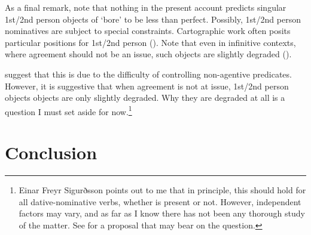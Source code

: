 \documentclass[output=paper,colorlinks,citecolor=brown,
]{langscibook}
\def\exattr#1{\hfill{} #1}
\begin{document}
As a final remark, note that nothing in the present account  predicts  singular 1st/2nd person objects of  `bore' to be less than perfect. Possibly, 1st/2nd person nominatives  are subject to special constraints. Cartographic work often  posits particular positions  for 1st/2nd person (\citealt{Savescu:2009al}). Note that even in infinitive contexts, where agreement should not be an issue, such objects are slightly degraded (\citealt[271]{SigurTHsson:2008dm}).


\z
\citet[271]{SigurTHsson:2008dm} suggest that this is due to the difficulty of controlling non-agentive predicates. However, it is suggestive that when agreement is not at issue, 1st/2nd person objects objects are only slightly degraded. Why they are degraded at all is a question I must set aside for now.\footnote{Einar Freyr Sigurðsson points out to me that in principle, this should hold for all dative-nominative verbs, whether  is present or not. However, independent factors may vary, and as far as I know there has not been any thorough study of the matter. See \cite{SigEPP} for a proposal that may bear on the question.} 


\section{Conclusion}
\end{document}

